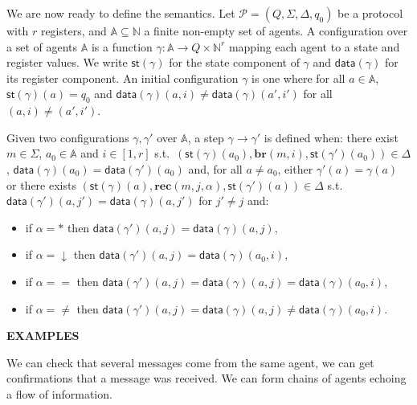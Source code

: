 \documentclass{article}
\newcommand{\nats}{\mathbb{N}}
\theoremstyle{definition}
\newtheorem{definition}[theorem]{Definition}
\begin{document}
	We are now ready to define the semantics. 
		Let $\mathcal{P} = (Q,\Sigma, \Delta, q_0)$ be a protocol with $r$ registers, and $\mathbb{A} \subseteq \nats$ a finite non-empty set of agents.
		A configuration over a set of agents $\mathbb{A}$ is a function $\gamma : \mathbb{A} \to Q \times \nats^{r}$ mapping each agent to a state and register values. 
		We write $\mathsf{st}(\gamma)$ for the state component of $\gamma$ and $\mathsf{data}(\gamma)$ for its register component.
		An {initial configuration} $\gamma$ is one where for all $a \in \mathbb{A}$, $\mathsf{st}(\gamma)(a) = q_0$ and $\mathsf{data}(\gamma)(a, i) \neq \mathsf{data}(\gamma)(a', i')$ for all $(a,i) \neq (a', i')$.
		
		 Given two configurations $\gamma, \gamma'$ over $\mathbb{A}$, a step $\gamma \rightarrow \gamma'$ is defined when:
		there exist $m \in \Sigma$, $a_0 \in \mathbb{A}$ and $i \in [1,r]$ s.t.\ $(\mathsf{st}(\gamma)(a_0), \mathbf{br}(m,i), \mathsf{st}(\gamma')(a_0)) \in \Delta$,
		$\mathsf{data}(\gamma)(a_0) = \mathsf{data}(\gamma')(a_0) $ and, for all $a \ne a_0$, either $\gamma'(a) = \gamma(a)$ or there exists $(\mathsf{st}(\gamma)(a),\mathbf{rec}(m,j, \alpha),\mathsf{st}(\gamma')(a)) \in \Delta$
		s.t. $\mathsf{data}(\gamma')(a, j') = \mathsf{data}(\gamma)(a, j') $ for $j' \neq j$ and:
			\begin{itemize}
				\item if $\alpha = \ast$ 
				then $\mathsf{data}(\gamma')(a,j) = \mathsf{data}(\gamma)(a,j)$,
				\item if $\alpha = \downarrow$ then $\mathsf{data}(\gamma')(a,j) = \mathsf{data}(\gamma)(a_0,i)$,
				\item if $\alpha = =$ then $\mathsf{data}(\gamma')(a,j) = \mathsf{data}(\gamma)(a,j) = \mathsf{data}(\gamma)(a_0,i)$,
				\item if $\alpha = \neq$ then $\mathsf{data}(\gamma')(a,j) = \mathsf{data}(\gamma)(a,j) \neq \mathsf{data}(\gamma)(a_0,i)$.
			\end{itemize}

	
	
	\textbf{EXAMPLES}
	
	We can check that several messages come from the same agent, we can get confirmations that a message was received.
	We can form chains of agents echoing a flow of information.
	
\end{document}
